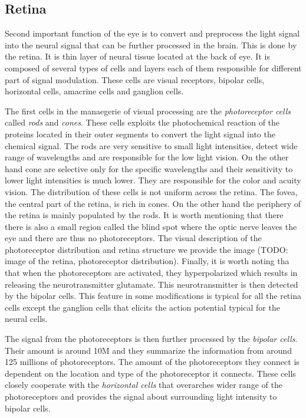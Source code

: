 \subsection{Retina}
\label{subsec:retina}
Second important function of the eye is to convert and preprocess the 
light signal into the neural signal that can be further processed in the brain.
This is done by the retina. It is thin layer of neural tissue located at the back
of eye. It is composed of several types of cells and layers each of them responsible
for different part of signal modulation. These cells are visual receptors,
bipolar cells, horizontal cells, amacrine cells and ganglion cells.

The first cells in the manaegerie of visual processing are the \emph{photoreceptor cells}
called \emph{rods} and \emph{cones}. These cells exploits the photochemical reaction of the 
proteins located in their outer segments to convert the light signal into the
chemical signal. The rods are very sensitive to small light intensities, 
detect wide range of wavelengths and are responsible for the low light vision.
On the other hand cone are selective only for the specific wavelengths and their
sensitivity to lower light intensities is much lower. They are responsible for the
color and acuity vision. The distribution of these cells is not uniform across
the retina. The fovea, the central part of the retina, is rich in cones. On the other
hand the periphery of the retina is mainly populated by the rods. It is worth
mentioning that there there is also a small region called the blind spot where
the optic nerve leaves the eye and there are thus no photoreceptors. The 
visual description of the photoreceptor distribution and retina structure we
provide the image (TODO: image of the retina, photoreceptor distribution). Finally,
it is worth noting tha that when the photoreceptors are activated, they hyperpolarized
which results in releasing the neurotransmitter glutamate. This neurotransmitter
is then detected by the bipolar cells. This feature in some modifications is 
typical for all the retina cells except the ganglion cells that elicits the 
action potential typical for the neural cells.

The signal from the photoreceptors is then further processed by the 
\emph{bipolar cells}. Their amount is around 10M and they summarize the 
information from around 125 millions of photoreceptors. The amount of the 
photoreceptors they connect is dependent on the location and type of the 
photoreceptor it connects. These cells closely cooperate with the 
\emph{horizontal cells} that overarches wider range of the photoreceptors
and provides the signal about surrounding light intensity to bipolar cells.

